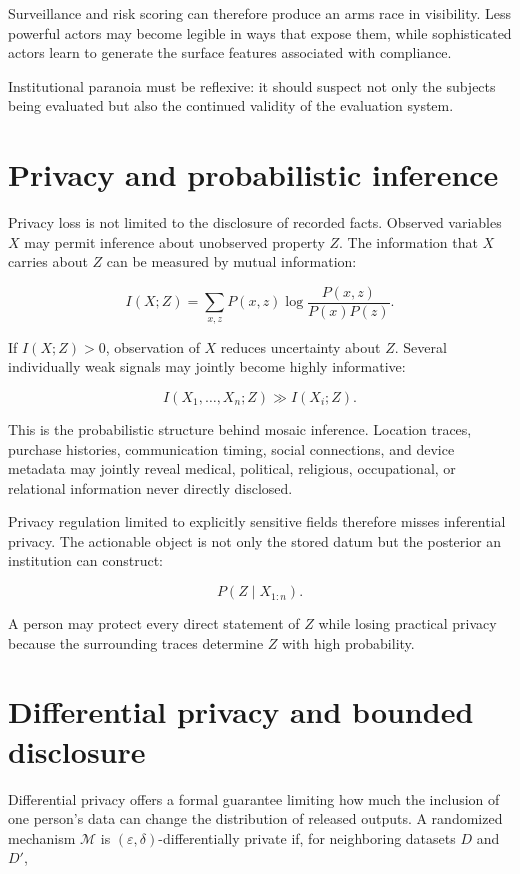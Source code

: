Surveillance and risk scoring can therefore produce an arms race in visibility. Less powerful actors may become legible in ways that expose them, while sophisticated actors learn to generate the surface features associated with compliance.

Institutional paranoia must be reflexive: it should suspect not only the subjects being evaluated but also the continued validity of the evaluation system.

\section{Privacy and probabilistic inference}
\label{sec:a49}

Privacy loss is not limited to the disclosure of recorded facts. Observed variables \(X\) may permit inference about unobserved property \(Z\). The information that \(X\) carries about \(Z\) can be measured by mutual information:

\[
I(X;Z)
=
\sum_{x,z}
P(x,z)
\log
\frac{P(x,z)}
{P(x)P(z)}.
\]

If \(I(X;Z)>0\), observation of \(X\) reduces uncertainty about \(Z\). Several individually weak signals may jointly become highly informative:

\[
I(X_1,\ldots,X_n;Z)
\gg
I(X_i;Z).
\]

This is the probabilistic structure behind mosaic inference. Location traces, purchase histories, communication timing, social connections, and device metadata may jointly reveal medical, political, religious, occupational, or relational information never directly disclosed.

Privacy regulation limited to explicitly sensitive fields therefore misses inferential privacy. The actionable object is not only the stored datum but the posterior an institution can construct:

\[
P(Z\mid X_{1:n}).
\]

A person may protect every direct statement of \(Z\) while losing practical privacy because the surrounding traces determine \(Z\) with high probability.

\section{Differential privacy and bounded disclosure}
\label{sec:a50}

Differential privacy offers a formal guarantee limiting how much the inclusion of one person's data can change the distribution of released outputs. A randomized mechanism \(\mathcal M\) is \((\varepsilon,\delta)\)-differentially private if, for neighboring datasets \(D\) and \(D'\),

